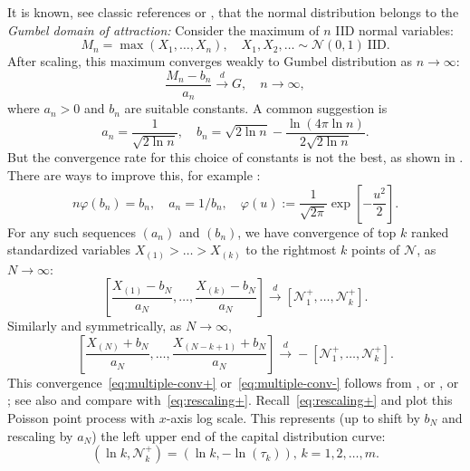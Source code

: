 \documentclass[12pt]{amsart}
\begin{document}
It is known, see classic references \cite[Theorem 8.3.1, Example 8.3.4]{Extreme-Book} or \cite[Chapter 1]{Resnick-Book}, that the normal distribution belongs to the {\it Gumbel domain of attraction:} Consider the maximum of $n$ IID normal variables:
$$
M_n = \max(X_1, \ldots, X_n),\quad X_1, X_2, \ldots \sim \mathcal N(0, 1)\ \mbox{IID.}
$$
After scaling, this maximum converges weakly to Gumbel distribution as $n \to \infty$:
\begin{equation}
\label{eq:Gumbel}
\frac{M_n - b_n}{a_n} \xrightarrow{d} G,\quad n \to \infty,
\end{equation}
where $a_n > 0$ and $b_n$ are suitable constants. A common suggestion is 
$$
a_n = \frac{1}{\sqrt{2\ln n}},\quad b_n = \sqrt{2\ln n} - \frac{\ln(4\pi\ln n)}{2\sqrt{2\ln n}}.
$$
But the convergence rate for this choice of constants is not the best, as shown in \cite[Example 8.3.4]{Extreme-Book}. There are ways to improve this, for example \cite{Hall}:
$$
n\varphi(b_n) = b_n,\quad a_n = 1/b_n,\quad \varphi(u) := \frac1{\sqrt{2\pi}}\exp\left[-\frac{u^2}2\right].
$$
For any such sequences $(a_n)$ and $(b_n)$, we have convergence of top $k$ ranked standardized variables $X_{(1)} > \ldots > X_{(k)}$ to the rightmost $k$ points of $\mathcal N$, as $N \to \infty$:
\begin{equation}
\label{eq:multiple-conv+}
\left[\frac{X_{(1)} - b_N}{a_N}, \ldots, \frac{X_{(k)} - b_N}{a_N}\right] \xrightarrow{d} \left[\mathcal N^+_1, \ldots, \mathcal N^+_k\right].
\end{equation}
Similarly and symmetrically, as $N \to \infty$, 
\begin{equation}
\label{eq:multiple-conv-}
\left[\frac{X_{(N)} + b_N}{a_N}, \ldots, \frac{X_{(N-k+1)} + b_N}{a_N}\right] \xrightarrow{d} -\left[\mathcal N^+_1, \ldots, \mathcal N^+_k\right].
\end{equation}
This convergence~\eqref{eq:multiple-conv+} or~\eqref{eq:multiple-conv-} follows from \cite[Theorem 8.4.2]{Extreme-Book}, or \cite{Miller}, or \cite[Chapter 4]{Resnick-Book}; see also \cite[Chapter 8, Exercises 6--8]{Extreme-Book} and compare with~\eqref{eq:rescaling+}. Recall~\eqref{eq:rescaling+} and plot this Poisson point process with $x$-axis log scale. This represents (up to shift by $b_N$ and rescaling by $a_N$) the left upper end of the capital distribution curve:
\begin{equation}
\label{eq:standard-curve+}
(\ln k, \mathcal N^+_k) = (\ln k, -\ln(\tau_k)),\, k = 1, 2, \ldots, m.
\end{equation}
\end{document}
